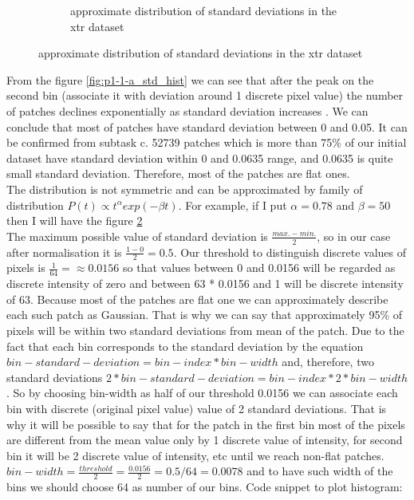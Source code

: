 \documentclass{article}
\begin{document}
\begin{enumerate}[label=(\alph*)]
\begin{figure}[t]
\begin{subfigure}{0.5\textwidth}
				 			\caption{approximate distribution of standard deviations in the xtr dataset}
				 			\label{fig:p1-1-a_dist}
				 		\end{subfigure}%
				 	\end{figure}
				 	From the figure \ref{fig:p1-1-a_std_hist} we can see that after the peak on the second bin (associate it with deviation around 1 discrete pixel value) the number of patches declines exponentially as  standard deviation increases . We can conclude that most of patches have standard deviation between 0 and 0.05. It can be confirmed from subtask c. 52739 patches which is more than 75\% of our initial dataset have standard deviation within 0 and 0.0635 range, and 0.0635 is quite small standard deviation. Therefore, most of the patches are flat ones. \\
				 	The distribution is not symmetric and can be approximated by family of distribution $P(t) \propto t^{\alpha} exp(-\beta t)$. For example, if I put $\alpha = 0.78$ and $\beta = 50$ then I will have the figure \ref{fig:p1-1-a_dist}\\
				 	The maximum possible value of standard deviation is $\frac{max. - min.}{2}$, so in our case after normalisation it is $\frac{1 - 0}{2}= 0.5$. Our threshold to distinguish discrete values of pixels is $\frac{1}{64} = \approx 0.0156$ so that values between 0 and 0.0156 will be regarded as discrete intensity of zero and between 63 * 0.0156 and 1 will be discrete intensity of 63. Because most of the patches are flat one we can approximately describe each such patch as Gaussian. That is why we can say that approximately 95\% of pixels will be within two standard deviations from mean of the patch. Due to the fact that each bin corresponds to the standard deviation by the equation $bin-standard-deviation = bin-index * bin-width$ and, therefore, two standard deviations $2 * bin-standard-deviation = bin-index * 2 * bin-width$. So by choosing bin-width as half of our threshold 0.0156 we can associate each bin with discrete (original pixel value) value of 2 standard deviations. That is why it will be possible to say that for the patch in the first bin most of the pixels are different from the mean value only by 1 discrete value of intensity, for second bin it will be 2 discrete value of intensity, etc until we reach non-flat patches. $bin-width = \frac{threshold} {2} = \frac{0.0156}{2} =0.5/64 = 0.0078$ and to have such width of the bins we should choose 64 as number of our bins.
				 	Code snippet to plot histogram:
				 	
				 	

\end{enumerate}
\end{document}
